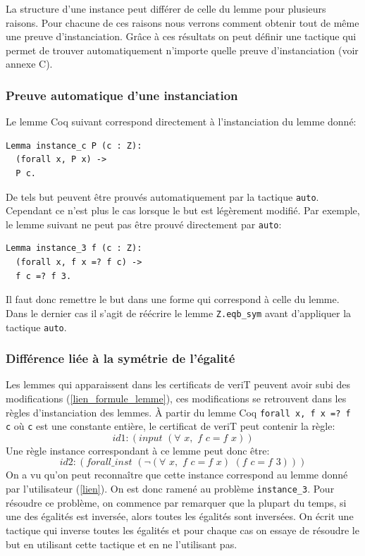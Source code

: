 \documentclass[11pt]{article}
\begin{document}
La structure d'une instance peut différer de celle du lemme pour plusieurs raisons. Pour chacune de ces raisons nous verrons comment obtenir tout de même une preuve d'instanciation. Grâce à ces résultats on peut définir une tactique qui permet de trouver automatiquement n'importe quelle preuve d'instanciation (voir annexe C).

\subsubsection{Preuve automatique d'une instanciation} \label{preuve_auto}

Le lemme Coq suivant correspond directement à l'instanciation du lemme donné:
\begin{lstlisting}[frame=single]
Lemma instance_c P (c : Z): 
  (forall x, P x) ->
  P c.
\end{lstlisting}

De tels but peuvent être prouvés automatiquement par la tactique \texttt{auto}. Cependant ce n'est plus le cas lorsque le but est légèrement modifié. Par exemple, le lemme suivant ne peut pas être prouvé directement par \texttt{auto}:

\begin{lstlisting}[frame=single]
Lemma instance_3 f (c : Z): 
  (forall x, f x =? f c) ->
  f c =? f 3.
\end{lstlisting}
Il faut donc remettre le but dans une forme qui correspond à celle du lemme. Dans le dernier cas il s'agit de réécrire le lemme \texttt{Z.eqb\_sym} avant d'appliquer la tactique \texttt{auto}.

\subsubsection{Différence liée à la symétrie de l'égalité}

Les lemmes qui apparaissent dans les certificats de veriT peuvent avoir subi des modifications (\ref{lien_formule_lemme}), ces modifications se retrouvent dans les règles d'instanciation des lemmes. À partir du lemme Coq \texttt{forall x, f x =? f c} où \texttt{c} est une constante entière, le certificat de veriT peut contenir la règle:
\[id1: (input \,\,(\forall\,\, x, \,\,f \,\,c = f \,\,x))\]
Une règle instance correspondant à ce lemme peut donc être: 
\[id2:(forall\_inst\,\, (\neg (\forall \,\,x,\,\, f\,\, c = f \,\,x) \,\, (f\,\, c = f\,\, 3)))\]
On a vu qu'on peut reconnaître que cette instance correspond au lemme donné par l'utilisateur (\ref{lien}). On est donc ramené au problème \texttt{instance\_3}. Pour résoudre ce problème, on commence par remarquer que la plupart du temps, si une des égalités est inversée, alors toutes les égalités sont inversées. On écrit une tactique qui inverse toutes les égalités et pour chaque cas on essaye de résoudre le but en utilisant cette tactique et en ne l'utilisant pas.
\end{document}
